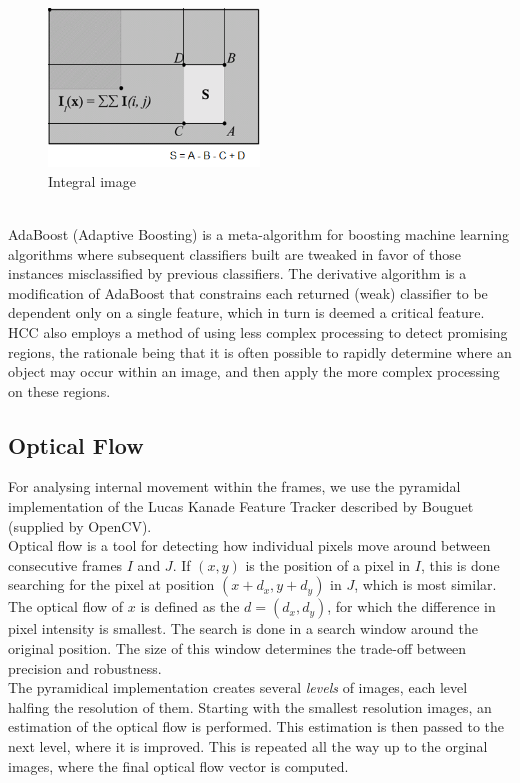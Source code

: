 %
\begin{figure}[!ht]
     \centering
     \includegraphics[width=0.50\textwidth]{img/integral_image.png}
     \caption{Integral image}\label{fig:integral_img}
\end{figure}\\
%
AdaBoost (Adaptive Boosting) is a meta-algorithm for boosting machine learning algorithms where subsequent classifiers built are tweaked in favor of those instances misclassified by previous classifiers. The derivative algorithm is a modification of AdaBoost that constrains each returned (weak) classifier to be dependent only on a single feature, which in turn is deemed a critical feature.\\
HCC also employs a method of using less complex processing to detect promising regions, the rationale being that it is often possible to rapidly determine where an object may occur within an image, and then apply the more complex processing on these regions.
%
\subsection{Optical Flow}
%
For analysing internal movement within the frames, we use the pyramidal implementation of the Lucas Kanade Feature Tracker described by Bouguet\cite{Bouguet2000} (supplied by OpenCV).\\
Optical flow is a tool for detecting how individual pixels move around between consecutive frames $I$ and $J$. If $(x,y)$ is the position of a pixel in $I$, this is done searching for the pixel at position $(x+d_x,y+d_y)$ in $J$, which is most similar. The optical flow of $x$ is defined as the $d=(d_x,d_y)$, for which the difference in pixel intensity is smallest. The search is done in a search window around the original position. The size of this window determines the trade-off between precision and robustness.\\
The pyramidical implementation creates several \textit{levels} of images, each level halfing the resolution of them. Starting with the smallest resolution images, an estimation of the optical flow is performed. This estimation is then passed to the next level, where it is improved. This is repeated all the way up to the orginal images, where the final optical flow vector is computed.
%
